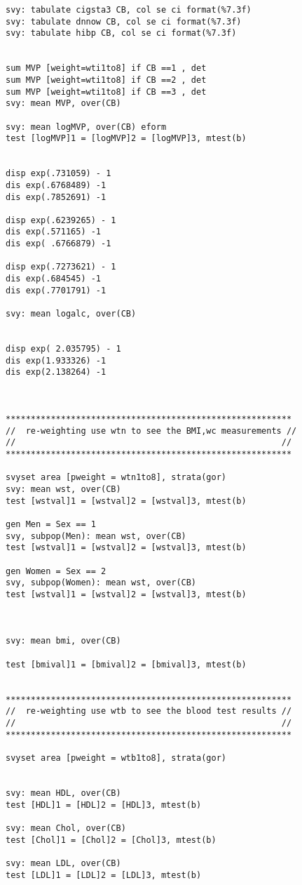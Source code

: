 \documentclass[]{article}
\begin{document}
\begin{verbatim}
svy: tabulate cigsta3 CB, col se ci format(%7.3f)
svy: tabulate dnnow CB, col se ci format(%7.3f)
svy: tabulate hibp CB, col se ci format(%7.3f)


sum MVP [weight=wti1to8] if CB ==1 , det
sum MVP [weight=wti1to8] if CB ==2 , det
sum MVP [weight=wti1to8] if CB ==3 , det
svy: mean MVP, over(CB)

svy: mean logMVP, over(CB) eform
test [logMVP]1 = [logMVP]2 = [logMVP]3, mtest(b) 


disp exp(.731059) - 1    
dis exp(.6768489) -1 
dis exp(.7852691) -1

disp exp(.6239265) - 1    
dis exp(.571165) -1 
dis exp( .6766879) -1

disp exp(.7273621) - 1    
dis exp(.684545) -1 
dis exp(.7701791) -1

svy: mean logalc, over(CB)


disp exp( 2.035795) - 1    
dis exp(1.933326) -1 
dis exp(2.138264) -1



*********************************************************
//  re-weighting use wtn to see the BMI,wc measurements //
//                                                     //
*********************************************************

svyset area [pweight = wtn1to8], strata(gor)
svy: mean wst, over(CB)
test [wstval]1 = [wstval]2 = [wstval]3, mtest(b) 

gen Men = Sex == 1 
svy, subpop(Men): mean wst, over(CB)
test [wstval]1 = [wstval]2 = [wstval]3, mtest(b) 

gen Women = Sex == 2
svy, subpop(Women): mean wst, over(CB)
test [wstval]1 = [wstval]2 = [wstval]3, mtest(b) 



svy: mean bmi, over(CB)

test [bmival]1 = [bmival]2 = [bmival]3, mtest(b) 


*********************************************************
//  re-weighting use wtb to see the blood test results //
//                                                     //
*********************************************************

svyset area [pweight = wtb1to8], strata(gor)


svy: mean HDL, over(CB)
test [HDL]1 = [HDL]2 = [HDL]3, mtest(b) 

svy: mean Chol, over(CB)
test [Chol]1 = [Chol]2 = [Chol]3, mtest(b) 

svy: mean LDL, over(CB)
test [LDL]1 = [LDL]2 = [LDL]3, mtest(b) 


\end{verbatim}
\end{document}
